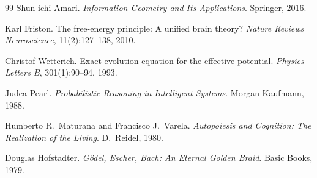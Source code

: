 \documentclass[12pt, a4paper]{article}
\theoremstyle{definition}
\begin{document}
\begin{thebibliography}{99}
Shun-ichi Amari.
\newblock \textit{Information Geometry and Its Applications}.
\newblock Springer, 2016.

Karl Friston.
\newblock The free-energy principle: A unified brain theory?
\newblock \textit{Nature Reviews Neuroscience}, 11(2):127--138, 2010.

Christof Wetterich.
\newblock Exact evolution equation for the effective potential.
\newblock \textit{Physics Letters B}, 301(1):90--94, 1993.

Judea Pearl.
\newblock \textit{Probabilistic Reasoning in Intelligent Systems}.
\newblock Morgan Kaufmann, 1988.

Humberto R.\ Maturana and Francisco J.\ Varela.
\newblock \textit{Autopoiesis and Cognition: The Realization of the Living}.
\newblock D.\ Reidel, 1980.

Douglas Hofstadter.
\newblock \textit{G{\"o}del, Escher, Bach: An Eternal Golden Braid}.
\newblock Basic Books, 1979.

\end{thebibliography}
\end{document}
